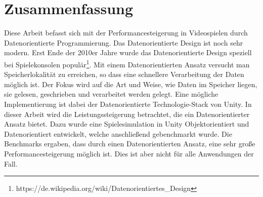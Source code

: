 \thispagestyle{empty}
\section*{Zusammenfassung}
Diese Arbeit befasst sich mit der Performancesteigerung in Videospielen durch Datenorientierte Programmierung. Das Datenorientierte Design ist noch sehr modern. Erst Ende der 2010er Jahre wurde das Datenorientierte Design speziell bei Spielekonsolen populär\footnote{https://de.wikipedia.org/wiki/Datenorientiertes\_Design}. Mit einem Datenorientierten Ansatz versucht man Speicherlokalität zu erreichen, so dass eine schnellere Verarbeitung der Daten möglich ist. Der Fokus wird auf die Art und Weise, wie Daten im Speicher liegen, sie gelesen, geschrieben und verarbeitet werden gelegt. Eine mögliche Implementierung ist dabei der Datenorientierte Technologie-Stack von Unity. In dieser Arbeit wird die Leistungssteigerung betrachtet, die ein Datenorientierter Ansatz bietet. Dazu wurde eine Spielesimulation in Unity Objektorientiert und Datenorientiert entwickelt, welche anschließend gebenchmarkt wurde. Die Benchmarks ergaben, dass durch einen Datenorientierten Ansatz, eine sehr große Performancesteigerung möglich ist. Dies ist aber nicht für alle Anwendungen der Fall.

